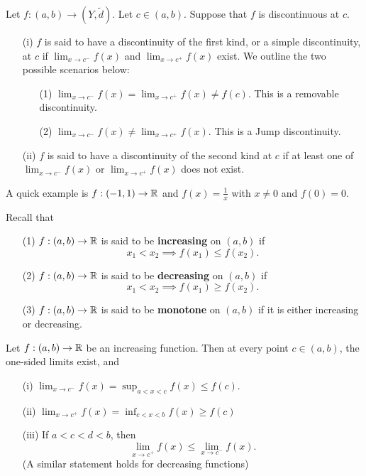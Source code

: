 \documentclass[a4paper]{article}
\begin{document}
\begin{definition}
    Let \( f: (a,b) \to (Y, \tilde{d}) \). Let \( c \in (a,b) \). Suppose that \( f  \) is discontinuous at \( c  \).
    \begin{enumerate}
        \item[(i)] \( f  \) is said to have a discontinuity of the first kind, or a simple discontinuity, at \( c  \) if \( \lim_{ x \to c^{-} } f(x) \) and \( \lim_{ x \to c^{+} } f(x) \) exist. We outline the two possible scenarios below:
            \begin{enumerate}
                \item[(1)] \( \lim_{ x \to c^{-} } f(x) = \lim_{ x \to c^{+} } f(x) \neq f(c) \). This is a removable discontinuity.
                \item[(2)] \( \lim_{ x \to c^{-} } f(x) \neq \lim_{ x \to c^{+} } f(x)  \). This is a Jump discontinuity.
            \end{enumerate}
        \item[(ii)] \( f  \) is said to have a discontinuity of the second kind at \( c  \) if at least one of \( \lim_{ x \to c^{-} } f(x) \) or \( \lim_{ x \to c^{+} } f(x) \) does not exist. 
    \end{enumerate}
\end{definition}

A quick example is \( f: (-1,1) \to \mathbb{R}  \) and \( f(x) = \frac{ 1 }{ x }  \) with \( x \neq 0 \) and \( f(0) = 0 \).

Recall that  
\begin{enumerate}
    \item[(1)] \( f: (a,b) \to \mathbb{R}  \) is said to be \textbf{increasing} on \( (a,b) \) if 
        \[  {x}_{1} < {x}_{2} \implies f({x}_{1}) \leq f({x}_{2}). \]
    \item[(2)] \( f: (a,b) \to \mathbb{R}  \) is said to be \textbf{decreasing} on \( (a,b) \) if  
        \[  {x}_{1} < {x}_{2} \implies f({x}_{1}) \geq  f({x}_{2}). \]
    \item[(3)] \( f: (a,b) \to \mathbb{R}  \) is said to be \textbf{monotone} on \( (a,b) \) if it is either increasing or decreasing.
\end{enumerate}

\begin{theorem}
   Let \( f: (a,b) \to \mathbb{R}  \) be an increasing function. Then at every point \( c \in (a,b) \), the one-sided limits exist, and 
   \begin{enumerate}
       \item[(i)] \( \lim_{ x \to c^{-} } f(x) = \sup_{a < x < c} f(x) \leq f(c) \).
       \item[(ii)] \( \lim_{ x \to c^{+} } f(x) = \inf_{c < x < b} f(x) \geq f(c) \) 
       \item[(iii)] If \( a <  c < d < b \), then
           \[  \lim_{ x \to c^{+} }  f(x) \leq \lim_{ x \to c^{-} } f(x). \]
           (A similar statement holds for decreasing functions)
   \end{enumerate} 
\end{theorem}
\end{document}
